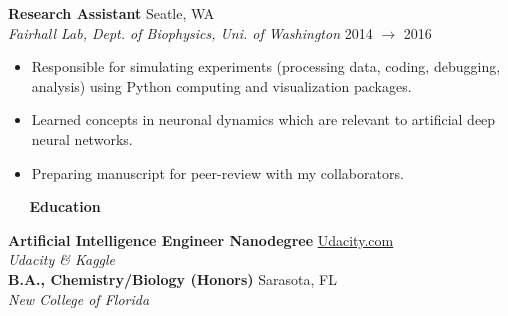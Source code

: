 \documentclass[a4paper,12pt]{article}
\newcommand{\resheading}[1]{{\vspace*{.06in} \colorbox{mygrey}{\begin{minipage}{\textwidth}{\textmd{\large \textbf{#1} \vphantom{p\^{E}}}}\end{minipage}}} }
\newcommand{\ressubheading}[4]{
        \textbf{#1} \hfill #2\\
        \textit{#3} \hfill #4 \\}
\begin{document}

\ressubheading{Research Assistant}{Seatle, WA}{Fairhall Lab, Dept. of Biophysics, Uni. of Washington}{2014 $\rightarrow$ 2016}
\begin{itemize}[noitemsep,topsep=0pt,parsep=0pt,partopsep=0pt, nolistsep]
\item Responsible for simulating experiments (processing data, coding, debugging, analysis) using Python computing and visualization packages.
\item Learned concepts in neuronal dynamics which are relevant to artificial deep neural networks.
\item Preparing manuscript for peer-review with my collaborators.\\
\end{itemize}
 
\resheading{~\faGraduationCap~ Education}

    \ressubheading{Artificial Intelligence Engineer Nanodegree}{\href{https://www.udacity.com/nanodegree}{Udacity.com}}{Udacity \& Kaggle}{}%
 
    \ressubheading{B.A., Chemistry/Biology (Honors)}{Sarasota, FL}{New College of Florida}{}%

 
\end{document}
